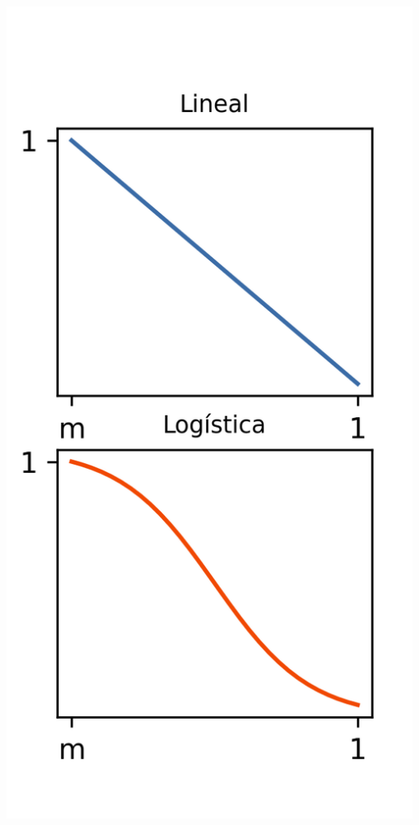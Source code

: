 \documentclass[aspectratio=43, 10pt]{beamer}
\begin{document}
\begin{frame}
\begin{columns}[c]
        \includegraphics[width=\textwidth]{images/f_catalog.png}
    \end{columns}
\end{frame}
\end{document}
